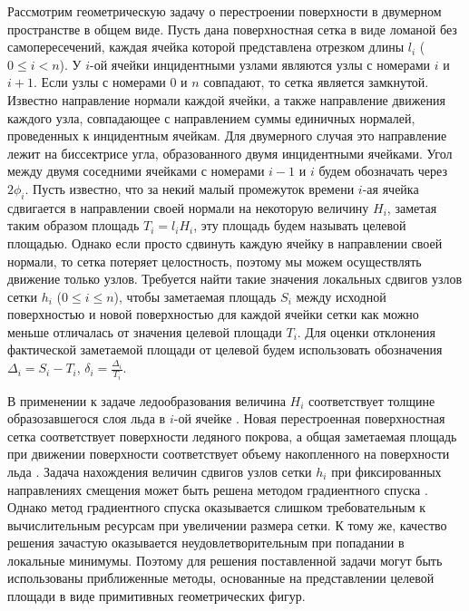 \documentclass[
11pt,%
tightenlines,%
twoside,%
onecolumn,%
nofloats,%
nobibnotes,%
nofootinbib,%
superscriptaddress,%
noshowpacs,%
centertags]%
{revtex4}
\begin{document}
Рассмотрим геометрическую задачу о перестроении поверхности в двумерном пространстве в общем виде.
Пусть дана поверхностная сетка в виде ломаной без самопересечений, каждая ячейка которой представлена отрезком длины $l_i$ ($0 \le i < n$).
У $i$-ой ячейки инцидентными узлами являются узлы с номерами $i$ и $i + 1$.
Если узлы с номерами $0$ и $n$ совпадают, то сетка является замкнутой.
Известно направление нормали каждой ячейки, а также направление движения каждого узла, совпадающее с направлением суммы единичных нормалей, проведенных к инцидентным ячейкам.
Для двумерного случая это направление лежит на биссектрисе угла, образованного двумя инцидентными ячейками.
Угол между двумя соседними ячейками с номерами $i - 1$ и $i$ будем обозначать через $2 \phi_i$.
Пусть известно, что за некий малый промежуток времени $i$-ая ячейка сдвигается в направлении своей нормали на некоторую величину $H_i$, заметая таким образом площадь $T_i = l_i H_i$, эту площадь будем называть целевой площадью.
Однако если просто сдвинуть каждую ячейку в направлении своей нормали, то сетка потеряет целостность, поэтому мы можем осуществлять движение только узлов.
Требуется найти такие значения локальных сдвигов узлов сетки $h_i$ ($0 \le i \le n$), чтобы заметаемая площадь $S_i$ между исходной поверхностью и новой поверхностью для каждой ячейки сетки как можно меньше отличалась от значения целевой площади $T_i$.
Для оценки отклонения фактической заметаемой площади от целевой будем использовать обозначения $\Delta_i = S_i - T_i$, $\delta_i = \frac{\Delta_i}{T_i}$.

В применении к задаче ледообразования величина $H_i$ соответствует толщине образозавшегося слоя льда в $i$-ой ячейке \cite{Beaugendre}.
Новая перестроенная поверхностная сетка соответствует поверхности ледяного покрова, а общая заметаемая площадь при движении поверхности соответствует объему накопленного на поверхности льда \cite{Tong}.
Задача нахождения величин сдвигов узлов сетки $h_i$ при фиксированных направлениях смещения может быть решена методом градиентного спуска \cite{Rybakov}.
Однако метод градиентного спуска оказывается слишком требовательным к вычислительным ресурсам при увеличении размера сетки.
К тому же, качество решения зачастую оказывается неудовлетворительным при попадании в локальные минимумы.
Поэтому для решения поставленной задачи могут быть использованы приближенные методы, основанные на представлении целевой площади в виде примитивных геометрических фигур.

\end{document}
